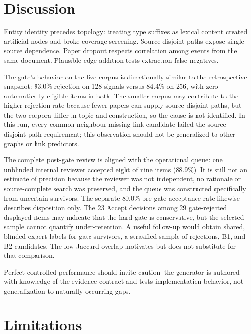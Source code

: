 \documentclass[conference, onecolumn]{IEEEtran}
\begin{document}
\section{Discussion}

Entity identity precedes topology: treating type suffixes as lexical content created artificial nodes and broke coverage screening. Source-disjoint paths expose single-source dependence. Paper dropout respects correlation among events from the same document. Plausible edge addition tests extraction false negatives.

The gate's behavior on the live corpus is directionally similar to the retrospective snapshot: 93.0\% rejection on 128 signals versus 84.4\% on 256, with zero automatically eligible items in both. The smaller corpus may contribute to the higher rejection rate because fewer papers can supply source-disjoint paths, but the two corpora differ in topic and construction, so the cause is not identified. In this run, every common-neighbour missing-link candidate failed the source-disjoint-path requirement; this observation should not be generalized to other graphs or link predictors.

The complete post-gate review is aligned with the operational queue: one unblinded internal reviewer accepted eight of nine items (88.9\%). It is still not an estimate of precision because the reviewer was not independent, no rationale or source-complete search was preserved, and the queue was constructed specifically from uncertain survivors. The separate 80.0\% pre-gate acceptance rate likewise describes disposition only. The 23 Accept decisions among 29 gate-rejected displayed items may indicate that the hard gate is conservative, but the selected sample cannot quantify under-retention. A useful follow-up would obtain shared, blinded expert labels for gate survivors, a stratified sample of rejections, B1, and B2 candidates. The low Jaccard overlap motivates but does not substitute for that comparison.

Perfect controlled performance should invite caution: the generator is authored with knowledge of the evidence contract and tests implementation behavior, not generalization to naturally occurring gaps.

\section{Limitations}
\end{document}
